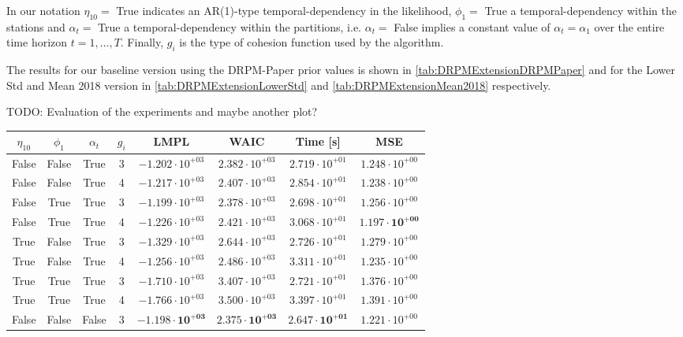 \documentclass[12pt,a4paper]{article}
\begin{document}
In our notation $\eta_{10} =$ True indicates an AR(1)-type temporal-dependency in the likelihood,
$\phi_1 =$ True a temporal-dependency within the stations and $\alpha_t = $ True a temporal-dependency within
the partitions, i.e. $\alpha_t = $ False implies a constant value of $\alpha_t = \alpha_1$ over the entire time horizon
$t = 1, \ldots, T$. Finally, $g_i$ is the type of cohesion function used by the algorithm.

The results for our baseline version using the DRPM-Paper prior values is shown in \cref{tab:DRPMExtensionDRPMPaper} and
for the Lower Std and Mean 2018 version in \cref{tab:DRPMExtensionLowerStd} and \cref{tab:DRPMExtensionMean2018} respectively.

TODO: Evaluation of the experiments and maybe another plot?

\begin{table}
\centering\begin{tabular}{cccccccc}
\toprule
$\eta_{10}$ & $\phi_1$ & $\alpha_t$ & $g_i$ & LMPL & WAIC & Time [s] & MSE \\
\midrule
False & False & True & 3 & $-1.202 \cdot 10^{+03}$ & $2.382 \cdot 10^{+03}$ & $2.719 \cdot 10^{+01}$ & $1.248 \cdot 10^{+00}$ \\
False & False & True & 4 & $-1.217 \cdot 10^{+03}$ & $2.407 \cdot 10^{+03}$ & $2.854 \cdot 10^{+01}$ & $1.238 \cdot 10^{+00}$  \\
False & True & True & 3 & $-1.199 \cdot 10^{+03}$ & $2.378 \cdot 10^{+03}$ & $2.698 \cdot 10^{+01}$ & $1.256 \cdot 10^{+00}$  \\
False & True & True & 4 & $-1.226 \cdot 10^{+03}$ & $2.421 \cdot 10^{+03}$ & $3.068 \cdot 10^{+01}$ & $\mathbf{1.197 \cdot 10^{+00}}$  \\
True & False & True & 3 & $-1.329 \cdot 10^{+03}$ & $2.644 \cdot 10^{+03}$ & $2.726 \cdot 10^{+01}$ & $1.279 \cdot 10^{+00}$  \\
True & False & True & 4 & $-1.256 \cdot 10^{+03}$ & $2.486 \cdot 10^{+03}$ & $3.311 \cdot 10^{+01}$ & $1.235 \cdot 10^{+00}$  \\
True & True & True & 3 & $-1.710 \cdot 10^{+03}$ & $3.407 \cdot 10^{+03}$ & $2.721 \cdot 10^{+01}$ & $1.376 \cdot 10^{+00}$ \\
True & True & True & 4 & $-1.766 \cdot 10^{+03}$ & $3.500 \cdot 10^{+03}$ & $3.397 \cdot 10^{+01}$ & $1.391 \cdot 10^{+00}$ \\
False & False & False & 3 & $\mathbf{-1.198 \cdot 10^{+03}}$ & $\mathbf{2.375 \cdot 10^{+03}}$ & $\mathbf{2.647 \cdot 10^{+01}}$ & $1.221 \cdot 10^{+00}$  \\

\end{tabular}
\end{table}
\end{document}
